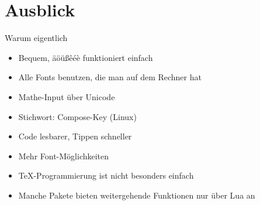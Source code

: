 \section{Ausblick}

\begin{frame}
  \centering
\end{frame}

\begin{frame}[fragile]{Warum eigentlich \LuaTeX}
  \linespread{1.5}
  \begin{description}
    \item[Unicode-Input]
      \begin{itemize}
        \item Bequem, äöüßêéè funktioniert einfach
      \end{itemize}
    \item[OTF-Fonts]
      \begin{itemize}
        \item Alle Fonts benutzen, die man auf dem Rechner hat
      \end{itemize}
    \item[Unicode-Math] 
      \begin{itemize}
        \item Mathe-Input über Unicode
        \item Stichwort: Compose-Key (Linux)
        \item Code lesbarer, Tippen schneller
        \item Mehr Font-Möglichkeiten
      \end{itemize}
    \item[Lua-Programmierung]
      \begin{itemize}
        \item \TeX-Programmierung ist nicht besonders einfach
        \item Manche Pakete bieten weitergehende Funktionen nur über Lua an
      \end{itemize}
  \end{description}
\end{frame}

